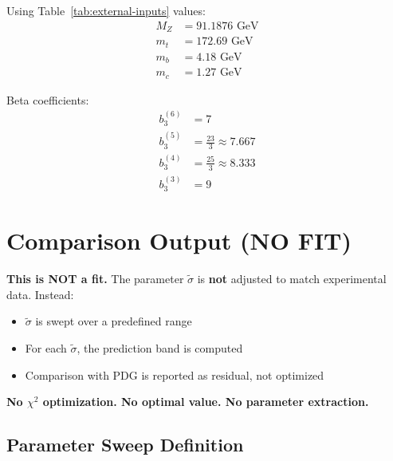 \documentclass[11pt,a4paper]{article}
\theoremstyle{definition}
\begin{document}
\begin{quarantinebox}
Using Table~\ref{tab:external-inputs} values:
\begin{align}
\label{eq:num-mz}
M_Z &= 91.1876 \text{ GeV} \\
\label{eq:num-mt}
m_t &= 172.69 \text{ GeV} \\
\label{eq:num-mb}
m_b &= 4.18 \text{ GeV} \\
\label{eq:num-mc}
m_c &= 1.27 \text{ GeV}
\end{align}

Beta coefficients:
\begin{align}
\label{eq:num-b6}
b_3^{(6)} &= 7 \\
\label{eq:num-b5}
b_3^{(5)} &= \frac{23}{3} \approx 7.667 \\
\label{eq:num-b4}
b_3^{(4)} &= \frac{25}{3} \approx 8.333 \\
\label{eq:num-b3}
b_3^{(3)} &= 9
\end{align}
\end{quarantinebox}

\section{Comparison Output (NO FIT)}
\label{sec:comparison}

\begin{nofitbox}
\textbf{This is NOT a fit.} The parameter $\tilde{\sigma}$ is \textbf{not}
adjusted to match experimental data. Instead:
\begin{itemize}
  \item $\tilde{\sigma}$ is swept over a predefined range
  \item For each $\tilde{\sigma}$, the prediction band is computed
  \item Comparison with PDG is reported as residual, not optimized
\end{itemize}
\textbf{No $\chi^2$ optimization. No optimal value. No parameter extraction.}
\end{nofitbox}

\subsection{Parameter Sweep Definition}
\label{subsec:sweep-def}
\end{document}
